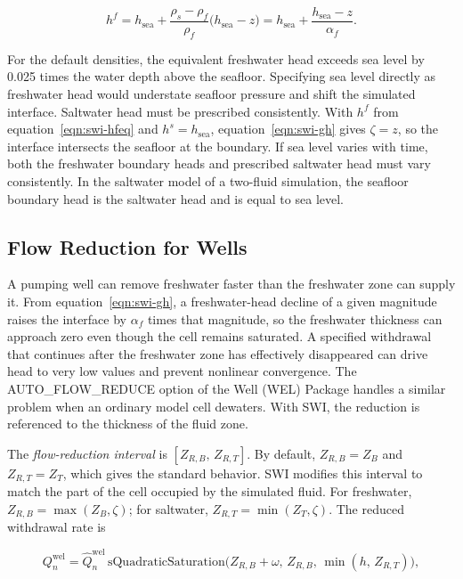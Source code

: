 \begin{equation}
\label{eqn:swi-hfeq}
h^{f}=h_{\mathrm{sea}}+\frac{\rho_{s}-\rho_{f}}{\rho_{f}}\big(h_{\mathrm{sea}}-z\big)
=h_{\mathrm{sea}}+\frac{h_{\mathrm{sea}}-z}{\alpha_{f}}.
\end{equation}

\noindent For the default densities, the equivalent freshwater head exceeds sea level by 0.025 times the water depth above the seafloor. Specifying sea level directly as freshwater head would understate seafloor pressure and shift the simulated interface. Saltwater head must be prescribed consistently. With $h^{f}$ from equation~\ref{eqn:swi-hfeq} and $h^{s}=h_{\mathrm{sea}}$, equation~\ref{eqn:swi-gh} gives $\zeta=z$, so the interface intersects the seafloor at the boundary. If sea level varies with time, both the freshwater boundary heads and prescribed saltwater head must vary consistently. In the saltwater model of a two-fluid simulation, the seafloor boundary head is the saltwater head and is equal to sea level.

\subsection{Flow Reduction for Wells}
\label{sec:swi-afr}

A pumping well can remove freshwater faster than the freshwater zone can supply it. From equation~\ref{eqn:swi-gh}, a freshwater-head decline of a given magnitude raises the interface by $\alpha_{f}$ times that magnitude, so the freshwater thickness can approach zero even though the cell remains saturated. A specified withdrawal that continues after the freshwater zone has effectively disappeared can drive head to very low values and prevent nonlinear convergence. The AUTO\_FLOW\_REDUCE option of the Well (WEL) Package handles a similar problem when an ordinary model cell dewaters. With SWI, the reduction is referenced to the thickness of the fluid zone.

The \emph{flow-reduction interval} is $[Z_{R,B},\,Z_{R,T}]$. By default, $Z_{R,B}=Z_{B}$ and $Z_{R,T}=Z_{T}$, which gives the standard \mf behavior. SWI modifies this interval to match the part of the cell occupied by the simulated fluid. For freshwater, $Z_{R,B}=\max(Z_{B},\zeta)$; for saltwater, $Z_{R,T}=\min(Z_{T},\zeta)$. The reduced withdrawal rate is

\begin{equation}
\label{eqn:swi-afr}
Q_{n}^{\mathrm{wel}}=\hat Q_{n}^{\mathrm{wel}}\,
\mathrm{sQuadraticSaturation}\big(Z_{R,B}+\omega,\,Z_{R,B},\,\min(h,\,Z_{R,T})\big),
\end{equation}

